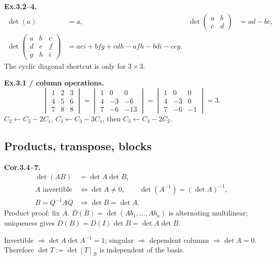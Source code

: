 \documentclass[11pt,letterpaper]{article}
\begin{document}
\textbf{Ex.3.2--4.} \[
\begin{aligned}
\det(a)&=a,&\det\begin{pmatrix}a&b\\c&d\end{pmatrix}&=ad-bc,\\
\det\begin{pmatrix}a&b&c\\d&e&f\\g&h&i\end{pmatrix}
&=aei+bfg+cdh-afh-bdi-ceg.
\end{aligned}
\] The cyclic diagonal shortcut is only for \(3\times3\).

\textbf{Ex.3.1 / column operations.} \[
\begin{vmatrix}1&2&3\\4&5&6\\7&8&8\end{vmatrix}
=\begin{vmatrix}1&0&0\\4&-3&-6\\7&-6&-13\end{vmatrix}
=\begin{vmatrix}1&0&0\\4&-3&0\\7&-6&-1\end{vmatrix}=3.
\] \(C_2\leftarrow C_2-2C_1\), \(C_3\leftarrow C_3-3C_1\), then
\(C_3\leftarrow C_3-2C_2\).

\newpage

\subsection{Products, transpose,
blocks}\label{products-transpose-blocks}

\textbf{Cor.3.4--7.} \[
\begin{aligned}
\det(AB)&=\det A\det B,\\
A\text{ invertible}&\iff\det A\ne0,\qquad
\det(A^{-1})=(\det A)^{-1},\\
B=Q^{-1}AQ&\Rightarrow\det B=\det A.
\end{aligned}
\] Product proof: fix \(A\). \(D(B)=\det(Ab_1,\ldots,Ab_n)\) is
alternating multilinear; uniqueness gives
\(D(B)=D(I)\det B=\det A\det B\).

Invertible \(\Rightarrow\det A\det A^{-1}=1\); singular \(\Rightarrow\)
dependent columns \(\Rightarrow\det A=0\). Therefore
\(\det T:=\det[T]_{\mathcal B}\) is independent of the basis.
\end{document}
